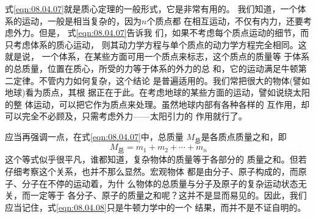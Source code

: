式\eqref{eqn:08.04.07}就是质心定理的一般形式，它是非常有用的。
我们知道，一个体系的运动，一般是相当复杂的，因为$ n $个质点都
在相互运动，不仅有内力，还要考虑外力。但是，
式\eqref{eqn:08.04.07}告诉我
们，如果不考虑每个质点运动的细节，而只考虑体系的质心运动，
则其动力学方程与单个质点的动力学方程完全相同。这就是说，
一个体系，在某些方面可用一个质点来标志，这个质点的质量等
于体系的总质量，位置在质心，所受的力等于体系的外力的总
和，它的运动满足牛顿第二定律。不管内力如何复杂，这个结论
是普遍适用的。我们常把很大的物体(譬如地球)看为质点，其根
据正在于此。在考虑地球的某些方面的运动，譬如说绕太阳的整
体运动，可以把它作为质点来处理。虽然地球内部有各种各样的
互作用，却可以完全不必顾及，只需考虑外力——太阳引力的
作用就行了。

应当再强调一点，在式\eqref{eqn:08.04.07}中，总质量
$ M _ { \text {总} } $是各质点质量之和，即
\begin{equation}\label{eqn:08.04.08}
  M _ { \text {总} } = m _ { 1 } + m _ { 2 } + \cdots + m _ { n }
\end{equation}
这个等式似乎很平凡，谁都知道，复杂物体的质量等于各部分的
质量之和。但若仔细考察这个关系，也并不那么显然。宏观物体
都是由分子、原子构成的，而原子、分子在不停的运动着，为什
么物体的总质量与分子及原子的复杂运动状态无关，而一定等于
各分子、原子的质量之和呢？这并不是显而易见的。因此，我们
应当记住，式\eqref{eqn:08.04.08}只是牛顿力学中的一个
结果，而并不是不证自明的。